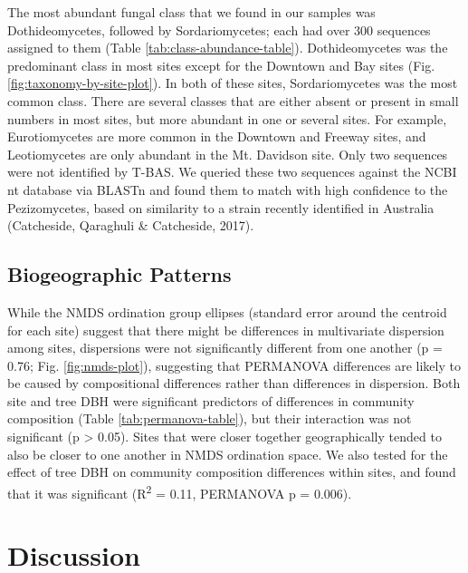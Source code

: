 \documentclass[fleqn,10pt,lineno]{wlpeerj} %
\begin{document}
The most abundant fungal class that we found in our samples was Dothideomycetes, followed by Sordariomycetes; each had over 300 sequences assigned to them (Table \ref{tab:class-abundance-table}). Dothideomycetes was the predominant class in most sites except for the Downtown and Bay sites (Fig. \ref{fig:taxonomy-by-site-plot}). In both of these sites, Sordariomycetes was the most common class. There are several classes that are either absent or present in small numbers in most sites, but more abundant in one or several sites. For example, Eurotiomycetes are more common in the Downtown and Freeway sites, and Leotiomycetes are only abundant in the Mt. Davidson site. Only two sequences were not identified by T-BAS. We queried these two sequences against the NCBI nt database via BLASTn and found them to match with high confidence to the Pezizomycetes, based on similarity to a strain recently identified in Australia (Catcheside, Qaraghuli \& Catcheside, 2017).

\hypertarget{biogeographic-patterns}{%
\subsection*{Biogeographic Patterns}\label{biogeographic-patterns}}

While the NMDS ordination group ellipses (standard error around the centroid for each site) suggest that there might be differences in multivariate dispersion among sites, dispersions were not significantly different from one another (p = 0.76; Fig. \ref{fig:nmds-plot}), suggesting that PERMANOVA differences are likely to be caused by compositional differences rather than differences in dispersion. Both site and tree DBH were significant predictors of differences in community composition (Table \ref{tab:permanova-table}), but their interaction was not significant (p \textgreater{} 0.05). Sites that were closer together geographically tended to also be closer to one another in NMDS ordination space. We also tested for the effect of tree DBH on community composition differences within sites, and found that it was significant (R\textsuperscript{2} = 0.11, PERMANOVA p = 0.006).

\hypertarget{discussion}{%
\section*{Discussion}\label{discussion}}
\end{document}
